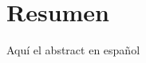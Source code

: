 \cleardoublepage
\thispagestyle{empty}
\chapter*{Resumen}
\begin{fullwidth}
	Aquí el abstract en español	
\end{fullwidth}